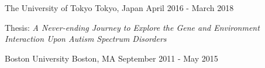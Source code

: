 %
%
%

\vspace*{0.4cm}

\begin{cventries}

    {The University of Tokyo}
    {Tokyo, Japan}
    {April 2016 - March 2018}
    {\begin{cvitems}
        \item{Thesis: \textit{A Never-ending Journey to Explore the Gene and Environment Interaction Upon Autism Spectrum Disorders}}
    \end{cvitems}}
    \vspace*{0.2cm}

    {Boston University}
    {Boston, MA}
    {September 2011 - May 2015}
    {}

\vspace*{-0.6cm}
\end{cventries}
